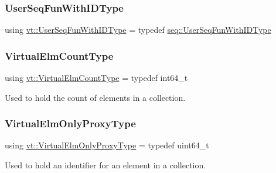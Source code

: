 \mbox{\label{namespacevt_a3170103960b4d8f8a0f722750bc0dcc9}} 
\subsubsection{\texorpdfstring{User\+Seq\+Fun\+With\+I\+D\+Type}{UserSeqFunWithIDType}}
{\footnotesize\ttfamily using \hyperlink{namespacevt_a3170103960b4d8f8a0f722750bc0dcc9}{vt\+::\+User\+Seq\+Fun\+With\+I\+D\+Type} = typedef \hyperlink{namespacevt_1_1seq_a1a58d0ebe1d6bbed8438607a9c717779}{seq\+::\+User\+Seq\+Fun\+With\+I\+D\+Type}}

\mbox{\label{namespacevt_ac115668758184050beff7a9281a2c490}} 
\subsubsection{\texorpdfstring{Virtual\+Elm\+Count\+Type}{VirtualElmCountType}}
{\footnotesize\ttfamily using \hyperlink{namespacevt_ac115668758184050beff7a9281a2c490}{vt\+::\+Virtual\+Elm\+Count\+Type} = typedef int64\+\_\+t}



Used to hold the count of elements in a collection. 

\mbox{\label{namespacevt_aa68633cd16822ae31c1cf521f817a23e}} 
\subsubsection{\texorpdfstring{Virtual\+Elm\+Only\+Proxy\+Type}{VirtualElmOnlyProxyType}}
{\footnotesize\ttfamily using \hyperlink{namespacevt_aa68633cd16822ae31c1cf521f817a23e}{vt\+::\+Virtual\+Elm\+Only\+Proxy\+Type} = typedef uint64\+\_\+t}



Used to hold an identifier for an element in a collection. 

\mbox{\label{namespacevt_a1b417dd5d684f045bb58a0ede70045ac}} 
